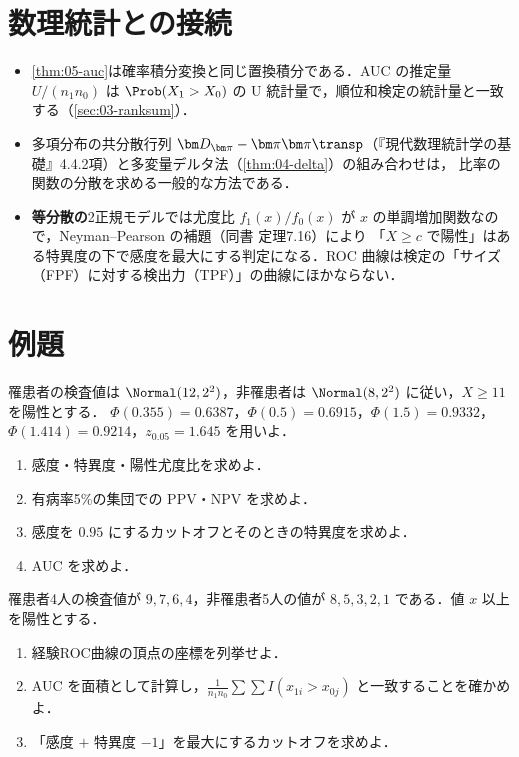 \section{数理統計との接続}\label{sec:05-link}
\begin{linkbox}
\begin{itemize}
\item \cref{thm:05-auc}は確率積分変換と同じ置換積分である．AUC の推定量 $U/(n_1n_0)$ は $\Prob(X_1>X_0)$ の U 統計量で，順位和検定の統計量と一致する（\cref{sec:03-ranksum}）．
\item 多項分布の共分散行列 $\bm D_{\bm\pi}-\bm\pi\bm\pi\transp$（『現代数理統計学の基礎』4.4.2項）と多変量デルタ法（\cref{thm:04-delta}）の組み合わせは，
      比率の関数の分散を求める一般的な方法である．
\item \textbf{等分散の}2正規モデルでは尤度比 $f_1(x)/f_0(x)$ が $x$ の単調増加関数なので，Neyman--Pearson の補題（同書 定理7.16）により
      「$X\ge c$ で陽性」はある特異度の下で感度を最大にする判定になる．ROC 曲線は検定の「サイズ（FPF）に対する検出力（TPF）」の曲線にほかならない．
\end{itemize}
\end{linkbox}

\section{例題}\label{sec:05-ex}
\begin{reidai}[正規モデルと有病率]\label{reidai:05-1}
罹患者の検査値は $\Normal(12,2^2)$，非罹患者は $\Normal(8,2^2)$ に従い，$X\ge11$ を陽性とする．
$\Phi(0.355)=0.6387$，$\Phi(0.5)=0.6915$，$\Phi(1.5)=0.9332$，$\Phi(1.414)=0.9214$，$z_{0.05}=1.645$ を用いよ．
\begin{enumerate}[label=(\arabic*)]
\item 感度・特異度・陽性尤度比を求めよ．
\item 有病率5\%の集団での PPV・NPV を求めよ．
\item 感度を $0.95$ にするカットオフとそのときの特異度を求めよ．
\item AUC を求めよ．
\end{enumerate}
\end{reidai}

\begin{reidai}\label{reidai:05-2}
罹患者4人の検査値が $9,7,6,4$，非罹患者5人の値が $8,5,3,2,1$ である．値 $x$ 以上を陽性とする．
\begin{enumerate}[label=(\arabic*)]
\item 経験ROC曲線の頂点の座標を列挙せよ．
\item AUC を面積として計算し，$\frac{1}{n_1n_0}\sum\sum I(x_{1i}>x_{0j})$ と一致することを確かめよ．
\item 「感度 $+$ 特異度 $-1$」を最大にするカットオフを求めよ．
\end{enumerate}
\end{reidai}

